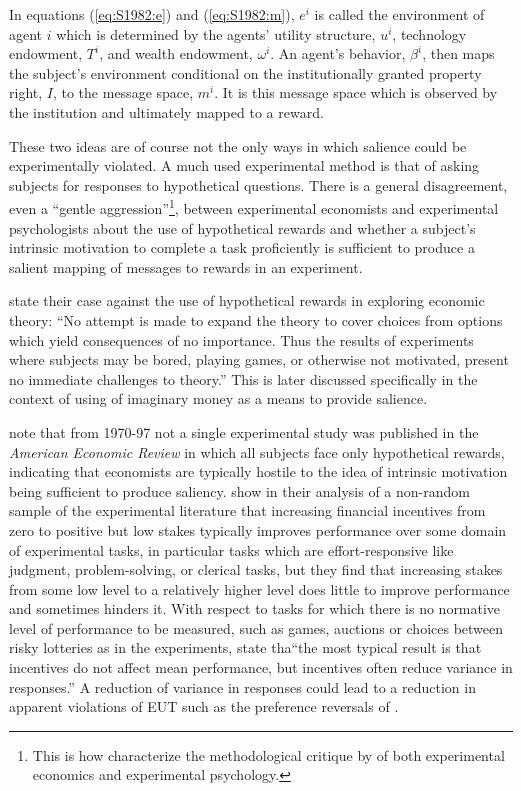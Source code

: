 \documentclass[../main.tex]{subfiles}
\begin{document}
In equations (\ref{eq:S1982:e}) and (\ref{eq:S1982:m}), $e^i$ is called the environment of agent $i$ which is determined by the agents' utility structure, $u^i$, technology endowment, $T^i$, and wealth endowment, $\omega^i$.
An agent's behavior, $\beta^i$, then maps the subject's environment conditional on the institutionally granted property right, $I$, to the message space, $m^i$.
It is this message space which is observed by the institution and ultimately mapped to a reward.

These two ideas are of course not the only ways in which salience could be experimentally violated.
A much used experimental method is that of asking subjects for responses to hypothetical questions.
There is a general disagreement, even a \enquote{gentle aggression}\footnote{This is how \textcite{Hertwig2001} characterize the methodological critique by \textcite{Smith1982} of both experimental economics and experimental psychology.}, between experimental economists and experimental psychologists about the use of hypothetical rewards and whether a subject's intrinsic motivation to complete a task proficiently is sufficient to produce a salient mapping of messages to  rewards in an experiment.

\textcite[624]{Grether1979} state their case against the use of hypothetical rewards in exploring economic theory:
\enquote{No attempt is made to expand the theory to cover choices from options which yield consequences of no importance.\textelp{} Thus the results of experiments where subjects may be bored, playing games, or otherwise not motivated, present no immediate challenges to theory.}
This is later discussed specifically in the context of using of imaginary money as a means to provide salience.

\textcite[31]{Camerer1999} note that from 1970-97 not a single experimental study was published in the \textit{American Economic Review} in which all subjects face only hypothetical rewards, indicating that economists are typically hostile to the idea of intrinsic motivation being sufficient to produce saliency.
\textcite{Camerer1999} show in their analysis of a non-random sample of the experimental literature that increasing financial incentives from zero to positive but low stakes typically improves performance over some domain of experimental tasks, in particular tasks which are effort-responsive like judgment, problem-solving, or clerical tasks, but they find that increasing stakes from some low level to a relatively higher level does little to improve performance and sometimes hinders it.
With respect to tasks for which there is no normative level of performance to be measured, such as games, auctions or choices between risky lotteries as in the \textcite{Grether1979} experiments, \textcite[34]{Camerer1999} state tha\enquote{the most typical result is that incentives do not affect mean performance, but incentives often reduce variance in responses.}
A reduction of variance in responses could lead to a reduction in apparent violations of EUT such as the preference reversals of \textcite{Grether1979}.
\end{document}

